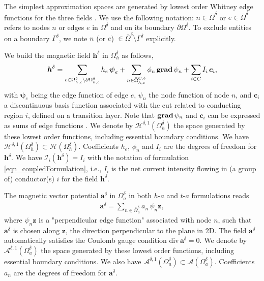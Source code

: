 \documentclass[journal]{IEEEtran}
\renewcommand{\vec}[1]{\boldsymbol{#1}} %
\newcommand{\grad}{\text{\textbf{grad}}\, }
\renewcommand{\div}{\text{div}\, }
\renewcommand{\a}{\vec a}
\newcommand{\h}{\vec h}
\newcommand{\Oa}{\Omega_a}
\newcommand{\Od}{\Omega^\delta}
\newcommand{\Oad}{\Omega_a^\delta}
\newcommand{\Ohd}{\Omega_h^\delta}
\newcommand{\Ohcd}{\Omega_{h,\text{c}}^\delta}
\newcommand{\Gd}{\Gamma^\delta}
\newcommand{\Odb}{\bar{\Omega}^\delta}
\newcommand{\Oadb}{\bar{\Omega}_a^\delta}
\newcommand{\Ohcdb}{\bar{\Omega}_{h,\text{c}}^\delta}
\newcommand{\Ohccdb}{\bar{\Omega}_{h,\text{c}}^{\text{C},\delta}}
\newcommand{\hsp}{\mathcal{H}}
\newcommand{\asp}{\mathcal{A}}
\newcommand{\hspdone}{\mathcal{H}^{\delta,1}}
\newcommand{\aspdone}{\mathcal{A}^{\delta,1}}
\newcommand{\ad}{\vec a^{\delta}}
\newcommand{\hd}{\vec h^{\delta}}
\begin{document}
The simplest approximation spaces are generated by lowest order Whitney edge functions for the three fields \cite{bossavit1988whitney}. We use the following notation: $n \in \Odb$ or $e \in \Odb$ refers to nodes $n$ or edges $e$ in $\Od$ and on its boundary $\partial \Od$. To exclude entities on a boundary $\Gd$, we note $n$ (or $e$) $\in \Odb \setminus \Gd$ explicitly.

We build the magnetic field $\hd$ in $\Ohd$ as follows,
\begin{equation}\label{eqn_h_decomposition}
\hd = \sum_{e \in \Ohcdb\setminus \partial \Ohcd} h_e \, \vec \psi_e + \sum_{n \in \Ohccdb} \phi_n \, \grad \psi_n + \sum_{i \in C} I_i \, \vec c_i,
\end{equation}
with $\vec \psi_e$ being the edge function of edge $e$, $\psi_n$ the node function of node $n$, and $\vec c_i$ a discontinuous basis function associated with the cut related to conducting region $i$, defined on a transition layer. Note that $\grad \psi_n$ and $\vec c_i$ can be expressed as sums of edge functions \cite{dular1999global, dular1994phd}. We denote by $\hspdone(\Ohd)$ the space generated by these lowest order functions, including essential boundary conditions. We have $\hspdone(\Ohd) \subset \hsp(\Ohd)$. Coefficients $h_e$, $\phi_n$ and $I_i$ are the degrees of freedom for $\hd$.  We have $\mathcal{I}_i(\h^\delta) = I_i$ with the notation of formulation \eqref{eqn_coupledFormulation}, i.e., $I_i$ is the net current intensity flowing in (a group of) conductor(s) $i$ for the field $\h^\delta$.


The magnetic vector potential $\ad$ in $\Oad$ in both $h$-$a$ and $t$-$a$ formulations reads 
\begin{align}\label{eqn_a_decomposition}
\ad = \sum_{n \in \Oadb} a_n \, \psi_n\vec z,
\end{align}%
where $\psi_n \vec z$ is a "perpendicular edge function" associated with node $n$, such that $\ad$ is chosen along  $\vec z$, the direction perpendicular to the plane in 2D. The field $\ad$ automatically satisfies the Coulomb gauge condition $\div\ad = 0$. %
We denote by $\aspdone(\Oad)$ the space generated by these lowest order functions, including essential boundary conditions. We also have $\aspdone(\Oad) \subset \asp(\Oad)$. Coefficients $a_n$ are the degrees of freedom for $\ad$. 
\end{document}
